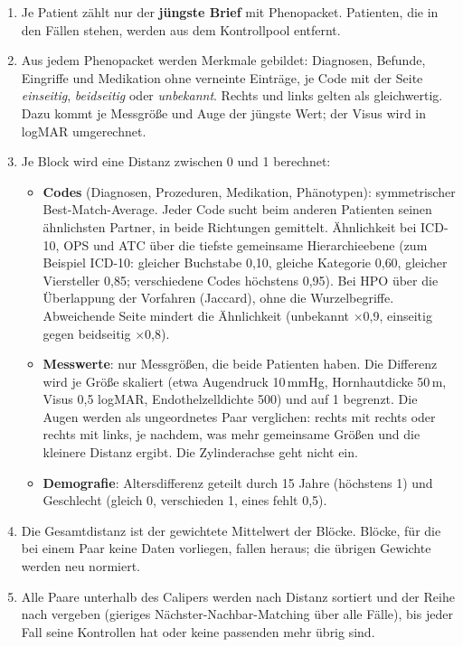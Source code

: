 \documentclass[11pt,a4paper,parskip=half-,headings=standardclasses,toc=bibliography,open=any]{scrreprt}
\begin{document}
\begin{enumerate}
  \item Je Patient zählt nur der \textbf{jüngste Brief} mit Phenopacket. Patienten, die in den Fällen stehen, werden aus dem Kontrollpool entfernt.
  \item Aus jedem Phenopacket werden Merkmale gebildet: Diagnosen, Befunde, Eingriffe und Medikation ohne verneinte Einträge, je Code mit der Seite \emph{einseitig}, \emph{beidseitig} oder \emph{unbekannt}. Rechts und links gelten als gleichwertig. Dazu kommt je Messgröße und Auge der jüngste Wert; der Visus wird in logMAR umgerechnet.
  \item Je Block wird eine Distanz zwischen 0 und 1 berechnet:
  \begin{itemize}
    \item \textbf{Codes} (Diagnosen, Prozeduren, Medikation, Phänotypen): symmetrischer Best-Match-Average. Jeder Code sucht beim anderen Patienten seinen ähnlichsten Partner, in beide Richtungen gemittelt. Ähnlichkeit bei ICD-10, OPS und ATC über die tiefste gemeinsame Hierarchieebene (zum Beispiel ICD-10: gleicher Buchstabe 0{,}10, gleiche Kategorie 0{,}60, gleicher Viersteller 0{,}85; verschiedene Codes höchstens 0{,}95). Bei HPO über die Überlappung der Vorfahren (Jaccard), ohne die Wurzelbegriffe. Abweichende Seite mindert die Ähnlichkeit (unbekannt $\times$0{,}9, einseitig gegen beidseitig $\times$0{,}8).
    \item \textbf{Messwerte}: nur Messgrößen, die beide Patienten haben. Die Differenz wird je Größe skaliert (etwa Augendruck 10\,mmHg, Hornhautdicke 50\,\textmu m, Visus 0{,}5 logMAR, Endothelzelldichte 500) und auf 1 begrenzt. Die Augen werden als ungeordnetes Paar verglichen: rechts mit rechts oder rechts mit links, je nachdem, was mehr gemeinsame Größen und die kleinere Distanz ergibt. Die Zylinderachse geht nicht ein.
    \item \textbf{Demografie}: Altersdifferenz geteilt durch 15 Jahre (höchstens 1) und Geschlecht (gleich 0, verschieden 1, eines fehlt 0{,}5).
  \end{itemize}
  \item Die Gesamtdistanz ist der gewichtete Mittelwert der Blöcke. Blöcke, für die bei einem Paar keine Daten vorliegen, fallen heraus; die übrigen Gewichte werden neu normiert.
  \item Alle Paare unterhalb des Calipers werden nach Distanz sortiert und der Reihe nach vergeben (gieriges Nächster-Nachbar-Matching über alle Fälle), bis jeder Fall seine Kontrollen hat oder keine passenden mehr übrig sind.
\end{enumerate}
\end{document}

